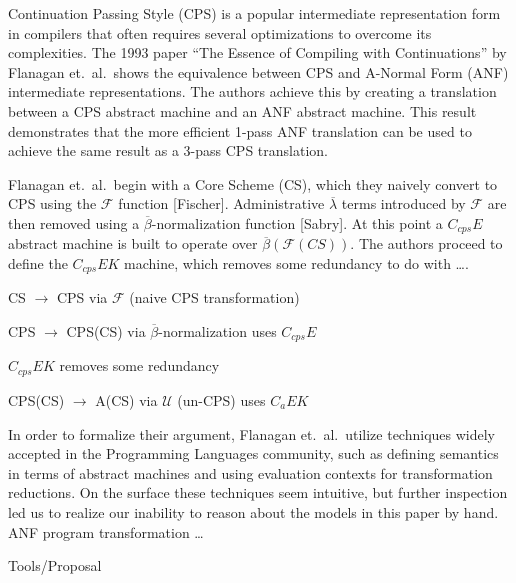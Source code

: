 \documentclass[12pt]{article}
\begin{document}
\thispagestyle{fancy}

Continuation Passing Style (CPS) is a popular intermediate representation form
in compilers that often requires several optimizations to overcome its
complexities. The 1993 paper ``The Essence of Compiling with Continuations''
by Flanagan et.\ al.\ shows the equivalence between CPS and A-Normal Form (ANF)
intermediate representations. The authors achieve this by creating a
translation between a CPS abstract machine and an ANF abstract machine. This
result demonstrates that the more efficient 1-pass ANF translation can be
used to achieve the same result as a 3-pass CPS translation.

Flanagan et.\ al.\ begin with a Core Scheme (CS), which they naively convert to
CPS using the $\mathcal{F}$ function [Fischer]. Administrative
$\overline{\lambda}$ terms introduced by $\mathcal{F}$ are then removed using a
$\overline{\beta}$-normalization function [Sabry]. At this point a $C_{cps}E$
abstract machine is built to operate over
$\overline{\beta}(\mathcal{F}(\textit{CS}))$. The authors proceed to define the
$C_{cps}EK$ machine, which removes some redundancy to do with \ldots.

CS $\to$ CPS via $\mathcal{F}$ (naive CPS transformation) 

CPS $\to$ CPS(CS) via $\overline{\beta}$-normalization uses $C_{cps}E$

$C_{cps}EK$ removes some redundancy

CPS(CS) $\to$ A(CS) via $\mathcal{U}$ (un-CPS) uses $C_{a}EK$

In order to formalize their argument, Flanagan et.\ al.\ utilize techniques
widely accepted in the Programming Languages community, such as defining
semantics in terms of abstract machines and using evaluation contexts for
transformation reductions. On the surface these techniques seem intuitive, but
further inspection led us to realize our inability to reason about the models
in this paper by hand. ANF program transformation \ldots

Tools/Proposal


\nocite{*}

\end{document}
